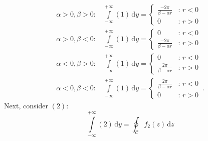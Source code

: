 \begin{align}
 \alpha>0, \beta>0 :&\, \int\limits_{-\infty}^{+\infty} (1) \,\mathrm{d}y = \begin{cases}
                                                                             \frac{-2\pi}{\beta-\alpha r} &:\, r<0 \\
                                                                             0                            &:\, r>0
                                                                            \end{cases} \\
 \alpha>0, \beta<0 :&\, \int\limits_{-\infty}^{+\infty} (1) \,\mathrm{d}y = \begin{cases}
                                                                             0                            &:\, r<0 \\
                                                                             \frac{-2\pi}{\beta-\alpha r} &:\, r>0
                                                                            \end{cases} \\
 \alpha<0, \beta>0 :&\, \int\limits_{-\infty}^{+\infty} (1) \,\mathrm{d}y = \begin{cases}
                                                                             0                            &:\, r<0 \\
                                                                             \frac{ 2\pi}{\beta-\alpha r} &:\, r>0
                                                                            \end{cases} \\
 \alpha<0, \beta<0 :&\, \int\limits_{-\infty}^{+\infty} (1) \,\mathrm{d}y = \begin{cases}
                                                                             \frac{ 2\pi}{\beta-\alpha r} &:\, r<0 \\
                                                                             0                            &:\, r>0
                                                                            \end{cases} \, .
\end{align}
Next, consider $(2)$:
\begin{equation}
  \int\limits_{-\infty}^{+\infty}
    (2) \,\mathrm{d}y
= \oint_\mathcal{C}
    f_2(z) \,\mathrm{d}z \label{eqn:int_f2}
\end{equation}
